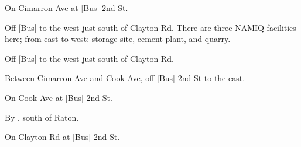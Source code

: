 

\begin{LocationList}

On Cimarron Ave at [Bus] 2nd St.

Off [Bus] to the west just south of  Clayton Rd. There are three NAMIQ facilities here; from east to west: storage site, cement plant, and quarry.

Off [Bus] to the west just south of  Clayton Rd.

Between Cimarron Ave and Cook Ave, off [Bus] 2nd St to the east.

\Location{\TruckService \Service}
On Cook Ave at [Bus] 2nd St.

\Location{\TruckStop \Gas \Rest \Weigh}
By  , south of Raton.

On  Clayton Rd at [Bus] 2nd St.

\end{LocationList}
